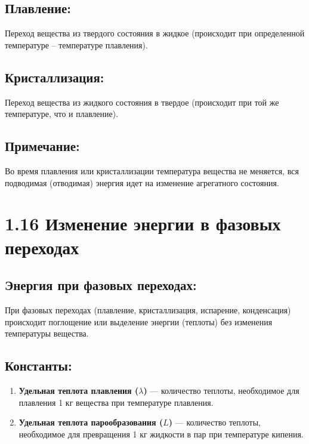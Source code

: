 \documentclass[a4paper,12pt]{article}
\begin{document}
\vspace{-9pt}
\subsection*{Плавление:}
\vspace{-3pt}
Переход вещества из твердого состояния в жидкое (происходит при определенной температуре – температуре плавления).

\vspace{-9pt}
\subsection*{Кристаллизация:}
\vspace{-3pt}
Переход вещества из жидкого состояния в твердое (происходит при той же температуре, что и плавление).

\vspace{-9pt}
\subsection*{Примечание:}
\vspace{-3pt}
Во время плавления или кристаллизации температура вещества не меняется, вся подводимая (отводимая) энергия идет на изменение агрегатного состояния.


\section*{1.16 Изменение энергии в фазовых переходах}

\vspace{-9pt}
\subsection*{Энергия при фазовых переходах:}
\vspace{-3pt}
При фазовых переходах (плавление, кристаллизация, испарение, конденсация) происходит поглощение или выделение энергии (теплоты) без изменения температуры вещества.

\vspace{-9pt}
\subsection*{Константы:}
\vspace{-3pt}
\begin{enumerate} [itemsep=0pt, topsep=0pt, parsep=0pt]
    \item \textbf{Удельная теплота плавления ($\lambda$)} --- количество теплоты, необходимое для плавления 1 кг вещества при температуре плавления.
    \item \textbf{Удельная теплота парообразования ($L$)} --- количество теплоты, необходимое для превращения 1 кг жидкости в пар при температуре кипения.
\end{enumerate}
\end{document}
